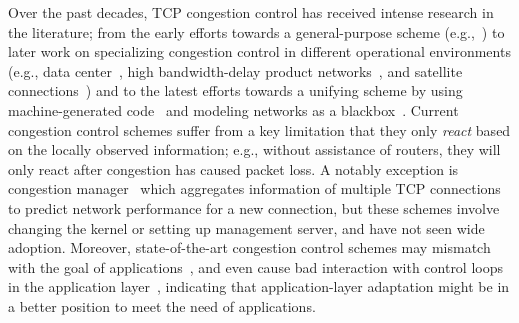 Over the past decades, TCP congestion control has received intense 
research in the literature; from the early efforts towards a 
general-purpose scheme 
(e.g.,~\cite{jacobson1988congestion,brakmo1994tcp,tcp-compound})
to later work on specializing congestion control in different operational
environments (e.g., data center~\cite{alizadeh2010data},
high bandwidth-delay product networks~\cite{cubic}, and satellite 
connections~\cite{tcp-hybla})
and to the latest efforts towards a unifying scheme by using 
machine-generated code~\cite{remy} and modeling networks 
as a blackbox~\cite{pcc}.
Current congestion control schemes suffer from a key
limitation that they only {\em react} based on the locally observed
information; e.g., without assistance of routers, they will only
react after congestion has caused packet loss.
A notably exception is congestion 
manager~\cite{balakrishnan1999integrated,seshan1997spand}
which aggregates information of multiple TCP connections to 
predict network performance for a new connection, but these
schemes involve changing the kernel or setting up management 
server, and have not seen wide adoption.
Moreover, state-of-the-art congestion control schemes may 
mismatch with the goal of applications~\cite{usenix12_ghobadi},
and even cause bad interaction with control loops in 
the application layer~\cite{confused,festive}, indicating that
application-layer adaptation might be in a better position to meet
the need of applications.

